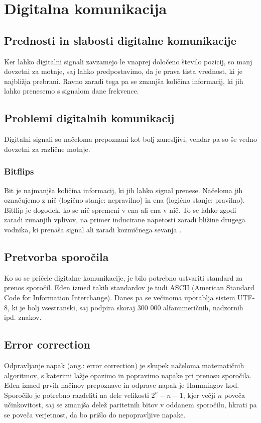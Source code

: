 \documentclass[12pt]{article}
\begin{document}
\newpage
\section{Digitalna komunikacija}
    \subsection{Prednosti in slabosti digitalne komunikacije}
        Ker lahko digitalni signali zavzamejo le vnaprej določeno število 
        pozicij, so manj dovzetni za motnje, saj lahko predpostavimo, da je 
        prava tista vrednost, ki je najbližja prebrani. Ravno zaradi tega pa se 
        zmanjša količina informacij, ki jih lahko prenesemo s signalom dane 
        frekvence.
    \subsection{Problemi digitalnih komunikacij}
        Digitalni signali so načeloma prepoznani kot bolj zanesljivi, vendar pa
        so še vedno dovzetni za različne motnje.
        \subsubsection{Bitflips}
            Bit je najmanjša količina informacij, ki jih lahko signal prenese. 
            Načeloma jih označujemo z nič (logično stanje: nepravilno) in ena 
            (logično stanje: pravilno). Bitflip je dogodek, ko se nič spremeni v
            ena ali ena v nič. To se lahko zgodi zaradi zunanjih vplivov, na 
            primer inducirane napetosti zaradi bližine drugega vodnika, ki 
            prenaša signal ali zaradi kozmičnega sevanja 
            \cite{veritasium_computers}.
    \subsection{Pretvorba sporočila} 
        Ko so se pričele digitalne komunikacije, je bilo potrebno ustvariti
        standard za prenos sporočil. Eden izmed takih standardov je tudi ASCII
        (American Standard Code for Information Interchange). Danes pa se
        večinoma uporablja sistem UTF-8, ki je bolj vsestranski, saj podpira
        skoraj 300 000 alfanumeričnih, nadzornih ipd. znakov.
    \newpage
        \subsection{Error correction}
        Odpravljanje napak (ang.: error correction) je skupek načeloma 
        matematičnih algoritmov, s katerimi lažje opazimo in popravimo napake 
        pri prenosu sporočila.
        Eden izmed prvih načinov prepoznave in odprave napak je Hammingov kod. 
        Sporočilo je potrebno razdeliti na dele velikosti $2^n - n - 1$,
        kjer večji $n$ poveča učinkovitost, saj se zmanjša delež paritetnih
        bitov v oddanem sporočilu, hkrati pa se poveča verjetnost, da bo prišlo
        do nepopravljive napake.
\end{document}

